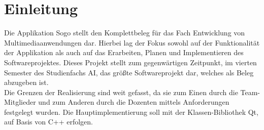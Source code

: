 \documentclass[a4paper]{scrartcl}
\begin{document}
\newpage

%
%
\thispagestyle{empty}

\tableofcontents

\newpage

%
%

\setcounter{page}{3}

\section{Einleitung}\label{ch:Einleitung}
Die Applikation Sogo stellt den Komplettbeleg für das Fach Entwicklung von Multimediaanwendungen dar. Hierbei lag der Fokus sowohl auf der Funktionalität der Applikation als auch auf das Erarbeiten, Planen und Implementieren des Softwareprojektes. Dieses Projekt stellt zum gegenwärtigen Zeitpunkt, im vierten Semester des Studienfachs AI, das größte Softwareprojekt dar, welches als Beleg abzugeben ist.
\\
Die Grenzen der Realisierung sind weit gefasst, da sie zum Einen durch die Team-Mitglieder und zum Anderen durch die Dozenten mittels Anforderungen festgelegt wurden. Die Hauptimplementierung soll mit der Klassen-Bibliothek Qt, auf Basis von C++ erfolgen.

\end{document}
